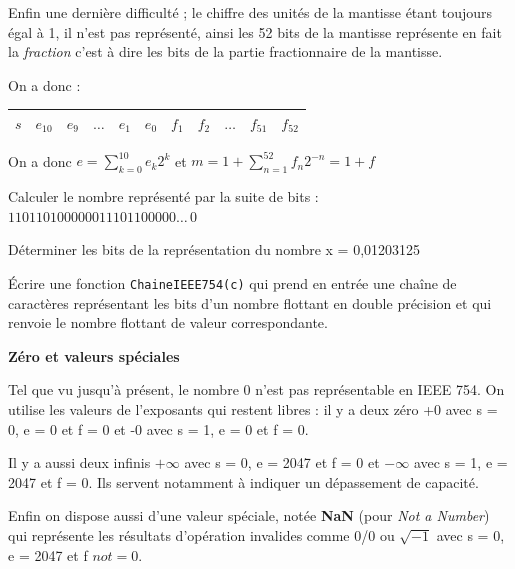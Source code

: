 Enfin une dernière difficulté ; le chiffre des unités de la mantisse étant toujours égal à 1, il n'est pas représenté, ainsi les 52 bits de la mantisse représente en fait la \emph{fraction} c'est à dire les bits de la partie fractionnaire de la mantisse.

On a donc : 
\begin{center}
		\begin{tabular}{| c || c | c | c | c | c || c | c | c | c | c | }
	\hline
	$s$ & $e_{10}$ & $e_9$ & $\dots$ & $e_1$  & $e_0$  & $f_1$ & $f_2$ & $\dots$ & $f_{51}$ & $f_{52}$  \\ \hline
\end{tabular}  

\end{center}

On a donc $e = \sum_{k=0}^{10} e_k 2^k$ et $m = 1+\sum_{n = 1}^{52}f_n 2^{-n} = 1 + f$


\exercice{}

Calculer le nombre représenté par la suite de bits : $\boxed{1} \boxed{10110100000}\boxed{011101100000\dots \, 0}$


\exercice{}

Déterminer les bits de la représentation du nombre x = 0,01203125


\exercice{}

\'Ecrire une fonction \verb+ChaineIEEE754(c)+ qui prend en entrée une chaîne de caractères
représentant les bits d'un nombre flottant en double précision et qui renvoie le nombre flottant de valeur correspondante.


{\bf \large Zéro et valeurs spéciales}
\bigskip

Tel que vu jusqu'à présent, le nombre 0 n'est pas représentable en IEEE 754. On utilise les valeurs de l'exposants qui restent libres : il y a deux zéro +0 avec s = 0, e = 0 et f = 0 et -0 avec s = 1, e = 0 et f = 0.

Il y a aussi deux infinis $+\infty$ avec s = 0, e = 2047 et f = 0 et $-\infty$ avec s = 1, e = 2047 et f = 0. Ils servent notamment à indiquer un dépassement de capacité.

Enfin on dispose aussi d'une valeur spéciale, notée {\bf NaN} (pour \emph{Not a Number}) qui représente les résultats d'opération invalides comme 0/0 ou $\sqrt{-1}$ avec s = 0, e = 2047 et f $not = 0$.




